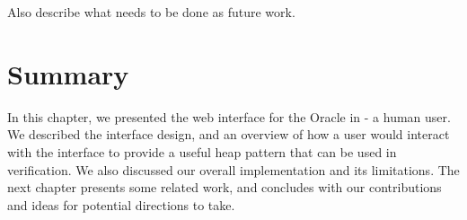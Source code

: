 Also describe what needs to be done as future work.

\section*{Summary}
In this chapter, we presented the web interface for the Oracle in \verifier - a human user. We described the interface design, and an overview of how a user would interact with the interface to provide a useful heap pattern that can be used in verification. We also discussed our overall implementation and its limitations. The next chapter presents some related work, and concludes with  our contributions and ideas for potential directions to take.